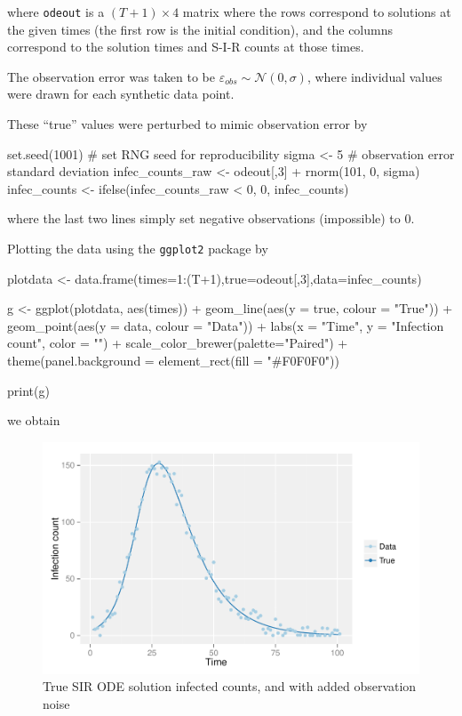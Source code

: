 \documentclass[12pt]{article}
\begin{document}
    where \verb|odeout| is a $(T+1) \times 4$ matrix where the rows correspond to solutions at the given times (the first row is the initial condition), and the columns correspond to the solution times and S-I-R counts at those times.

    The observation error was taken to be $\varepsilon_{obs} \sim \mathcal{N}(0,\sigma)$, where individual values were drawn for each synthetic data point.

    These ``true'' values were perturbed to mimic observation error by

    \begin{R}
    set.seed(1001)  # set RNG seed for reproducibility
    sigma <- 5       # observation error standard deviation
    infec_counts_raw <- odeout[,3] + rnorm(101, 0, sigma)
    infec_counts     <- ifelse(infec_counts_raw < 0, 0, infec_counts)
    \end{R}

    where the last two lines simply set negative observations (impossible) to 0.

    Plotting the data using the \verb|ggplot2| package by

    \begin{R}
    plotdata <- data.frame(times=1:(T+1),true=odeout[,3],data=infec_counts)

    g <- ggplot(plotdata, aes(times)) +
            geom_line(aes(y = true, colour = "True")) + 
            geom_point(aes(y = data, colour = "Data")) +
            labs(x = "Time", y = "Infection count", color = "") +
            scale_color_brewer(palette="Paired") +
            theme(panel.background = element_rect(fill = "#F0F0F0"))

    print(g)
    \end{R}

    we obtain

    \begin{figure}[H]
        \centering
        \includegraphics[width=\textwidth]{./images/dataplot.pdf}
        \caption{True SIR ODE solution infected counts, and with added observation noise}
        \label{dataplot}
    \end{figure}
\end{document}
